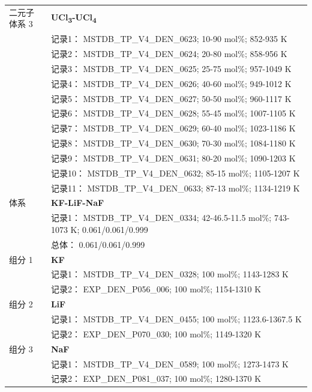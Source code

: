 \documentclass[12pt]{article}
\begin{document}
{\begin{longtable}[]{@{}
  >{\raggedright\arraybackslash}p{}
  >{\raggedright\arraybackslash}p{}@{}}
二元子体系 3  & \textbf{UCl\textsubscript{3}-UCl\textsubscript{4}} \\
 & 记录1： MSTDB\_TP\_V4\_DEN\_0623; 10-90 mol\%; 852-935 K \\
 & 记录2： MSTDB\_TP\_V4\_DEN\_0624; 20-80 mol\%; 858-956 K \\
 & 记录3： MSTDB\_TP\_V4\_DEN\_0625; 25-75 mol\%; 957-1049 K \\
 & 记录4： MSTDB\_TP\_V4\_DEN\_0626; 40-60 mol\%; 949-1012 K \\
 & 记录5： MSTDB\_TP\_V4\_DEN\_0627; 50-50 mol\%; 960-1117 K \\
 & 记录6： MSTDB\_TP\_V4\_DEN\_0628; 55-45 mol\%; 1007-1105 K \\
 & 记录7： MSTDB\_TP\_V4\_DEN\_0629; 60-40 mol\%; 1023-1186 K \\
 & 记录8： MSTDB\_TP\_V4\_DEN\_0630; 70-30 mol\%; 1084-1180 K \\
 & 记录9： MSTDB\_TP\_V4\_DEN\_0631; 80-20 mol\%; 1090-1203 K \\
 & 记录10： MSTDB\_TP\_V4\_DEN\_0632; 85-15 mol\%; 1105-1207 K \\
 & 记录11： MSTDB\_TP\_V4\_DEN\_0633; 87-13 mol\%; 1134-1219 K  \\

\midrule
体系 & \textbf{KF-LiF-NaF} \\
 & 记录1： MSTDB\_TP\_V4\_DEN\_0334; 42-46.5-11.5 mol\%; 743-1073 K; 0.061/0.061/0.999 \\
 & 总体： 0.061/0.061/0.999  \\

组分 1  & \textbf{KF} \\
 & 记录1： MSTDB\_TP\_V4\_DEN\_0328; 100 mol\%; 1143-1283 K \\
 & 记录2： EXP\_DEN\_P056\_006; 100 mol\%; 1154-1310 K  \\

组分 2  & \textbf{LiF} \\
 & 记录1： MSTDB\_TP\_V4\_DEN\_0455; 100 mol\%; 1123.6-1367.5 K \\
 & 记录2： EXP\_DEN\_P070\_030; 100 mol\%; 1149-1320 K  \\

组分 3  & \textbf{NaF} \\
 & 记录1： MSTDB\_TP\_V4\_DEN\_0589; 100 mol\%; 1273-1473 K \\
 & 记录2： EXP\_DEN\_P081\_037; 100 mol\%; 1280-1370 K  \\


\end{longtable}}
\end{document}
